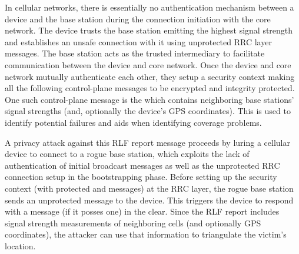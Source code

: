 In cellular networks, there is essentially
no authentication mechanism between a device and the base station during the connection initiation with the core network.
The device trusts the base station emitting the highest signal strength and
establishes an unsafe connection with it using unprotected RRC layer messages.
The base station acts as the trusted intermediary to facilitate communication between
the device and core network. Once the device and core network mutually authenticate each other,
they setup a security context making all the following control-plane messages to be encrypted and integrity protected.
One  such control-plane message is the \rlfReport which contains neighboring base stations'
signal strengths (and, optionally the device's GPS coordinates). This is used to identify
potential failures and aids when identifying coverage problems.

A privacy attack against
this RLF report message \cite{privacy_ndss16} proceeds by luring a cellular device to connect to a rogue base station, which exploits
the lack of authentication of initial broadcast messages as well as the unprotected RRC connection setup in the bootstrapping phase.
Before setting up the security context (with protected \securityModeCommand and \securityModeComplete messages)
at the RRC layer, the rogue base station sends an unprotected \ueInformationRequest
message to the device. This triggers the device to respond with a \rlfReport message (if it posses one) in the clear.
Since the RLF report includes signal strength measurements of neighboring cells (and optionally GPS coordinates),
the attacker can use that information to triangulate  the victim's location.

